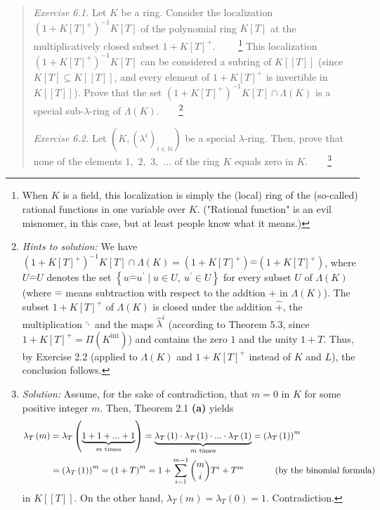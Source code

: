 \documentclass[12pt,final,notitlepage,onecolumn,german]{article}%
\begin{document}
\begin{quotation}
\textit{Exercise 6.1.} Let $K$ be a ring. Consider the localization $\left(
1+K\left[  T\right]  ^{+}\right)  ^{-1}K\left[  T\right]  $ of the polynomial
ring $K\left[  T\right]  $ at the multiplicatively closed subset $1+K\left[
T\right]  ^{+}$. \ \ \ \ \footnote{When $K$ is a field, this localization is
simply the (local) ring of the (so-called) rational functions in one variable
over $K$. ("Rational function" is an evil misnomer, in this case, but at least
people know what it means.)} This localization $\left(  1+K\left[  T\right]
^{+}\right)  ^{-1}K\left[  T\right]  $ can be considered a subring of
$K\left[  \left[  T\right]  \right]  $ (since $K\left[  T\right]  \subseteq
K\left[  \left[  T\right]  \right]  $, and every element of $1+K\left[
T\right]  ^{+}$ is invertible in $K\left[  \left[  T\right]  \right]  $).
Prove that the set $\left(  1+K\left[  T\right]  ^{+}\right)  ^{-1}K\left[
T\right]  \cap\Lambda\left(  K\right)  $ is a special sub-$\lambda$-ring of
$\Lambda\left(  K\right)  $.\ \ \ \ \footnote{\textit{Hints to solution:} We
have $\left(  1+K\left[  T\right]  ^{+}\right)  ^{-1}K\left[  T\right]
\cap\Lambda\left(  K\right)  =\left(  1+K\left[  T\right]  ^{+}\right)
\widehat{-}\left(  1+K\left[  T\right]  ^{+}\right)  $, where $U\widehat{-}U$
denotes the set $\left\{  u\widehat{-}u^{\prime}\mid u\in U,\ u^{\prime}\in
U\right\}  $ for every subset $U$ of $\Lambda\left(  K\right)  $ (where
$\widehat{-}$ means subtraction with respect to the addtion $\widehat{+}$ in
$\Lambda\left(  K\right)  $). The subset $1+K\left[  T\right]  ^{+}$ of
$\Lambda\left(  K\right)  $ is closed under the addition $\widehat{+}$, the
multiplication $\widehat{\cdot}$ and the maps $\widehat{\lambda}^{i}$
(according to Theorem 5.3, since $1+K\left[  T\right]  ^{+}=\Pi\left(
K^{\operatorname*{int}}\right)  $) and contains the zero $1$ and the unity
$1+T$. Thus, by Exercise 2.2 (applied to $\Lambda\left(  K\right)  $ and
$1+K\left[  T\right]  ^{+}$ instead of $K$ and $L$), the conclusion follows.}

\textit{Exercise 6.2.} Let $\left(  K,\left(  \lambda^{i}\right)
_{i\in\mathbb{N}}\right)  $ be a special $\lambda$-ring. Then, prove that none
of the elements $1,$ $2,$ $3,$ $...$ of the ring $K$ equals zero in
$K$.\ \ \ \ \footnote{\textit{Solution:} Assume, for the sake of
contradiction, that $m=0$ in $K$ for some positive integer $m$. Then, Theorem
2.1 \textbf{(a)} yields%
\begin{align*}
\lambda_{T}\left(  m\right)   &  =\lambda_{T}\left(  \underbrace
{1+1+...+1}_{m\text{ times}}\right)  =\underbrace{\lambda_{T}\left(  1\right)
\cdot\lambda_{T}\left(  1\right)  \cdot...\cdot\lambda_{T}\left(  1\right)
}_{m\text{ times}}=\left(  \lambda_{T}\left(  1\right)  \right)  ^{m}\\
&  =\left(  \lambda_{T}\left(  1\right)  \right)  ^{m}=\left(  1+T\right)
^{m}=1+\sum_{i=1}^{m-1}\dbinom{m}{i}T^{i}+T^{m}\ \ \ \ \ \ \ \ \ \ \left(
\text{by the binomial formula}\right)
\end{align*}
in $K\left[  \left[  T\right]  \right]  $. On the other hand, $\lambda
_{T}\left(  m\right)  =\lambda_{T}\left(  0\right)  =1.$ Contradiction.}
\end{quotation}
\end{document}
